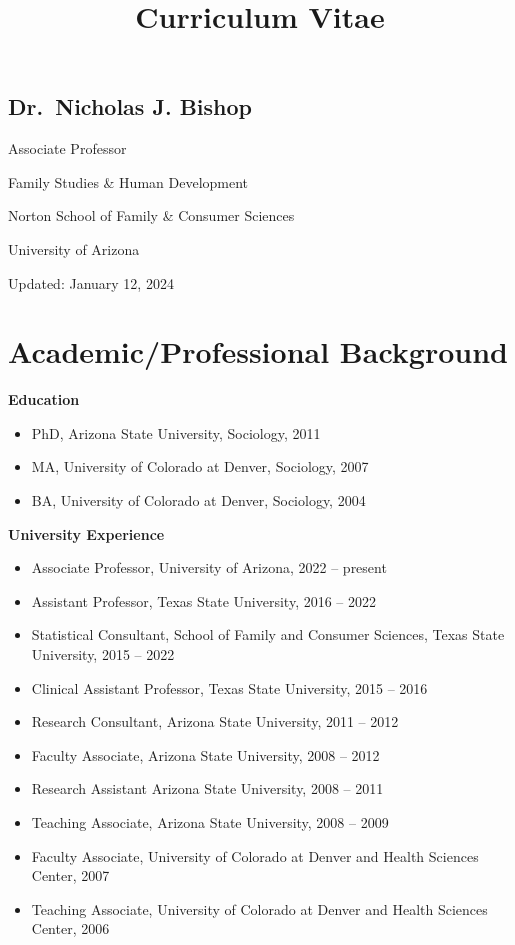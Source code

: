 \documentclass[
]{article}
\title{Curriculum Vitae}
\author{}
\date{\vspace{-2.5em}}
\begin{document}
\maketitle

\hypertarget{dr.-nicholas-j.-bishop}{%
\subsection{\texorpdfstring{\textbf{Dr.~Nicholas J.
Bishop}}{Dr.~Nicholas J. Bishop}}\label{dr.-nicholas-j.-bishop}}

Associate Professor

Family Studies \& Human Development

Norton School of Family \& Consumer Sciences

University of Arizona

Updated: January 12, 2024

\hypertarget{academicprofessional-background}{%
\section{\texorpdfstring{\textbf{Academic/Professional
Background}}{Academic/Professional Background}}\label{academicprofessional-background}}

\textbf{Education}

\begin{itemize}
\item
  PhD, Arizona State University, Sociology, 2011
\item
  MA, University of Colorado at Denver, Sociology, 2007
\item
  BA, University of Colorado at Denver, Sociology, 2004
\end{itemize}

\textbf{University Experience}

\begin{itemize}
\item
  Associate Professor, University of Arizona, 2022 -- present
\item
  Assistant Professor, Texas State University, 2016 -- 2022
\item
  Statistical Consultant, School of Family and Consumer Sciences, Texas
  State University, 2015 -- 2022
\item
  Clinical Assistant Professor, Texas State University, 2015 -- 2016
\item
  Research Consultant, Arizona State University, 2011 -- 2012
\item
  Faculty Associate, Arizona State University, 2008 -- 2012
\item
  Research Assistant Arizona State University, 2008 -- 2011
\item
  Teaching Associate, Arizona State University, 2008 -- 2009
\item
  Faculty Associate, University of Colorado at Denver and Health
  Sciences Center, 2007
\item
  Teaching Associate, University of Colorado at Denver and Health
  Sciences Center, 2006
\end{itemize}
\end{document}
